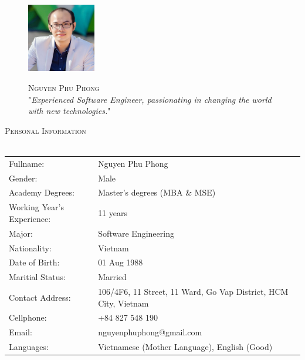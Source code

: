 \documentclass[a4paper]{article}
\newcommand{\lineunder} {
    \vspace*{-8pt} \\
    \hspace*{-18pt} \hrulefill \\
}
\newcommand{\header} [1] {
    {\hspace*{-18pt}\vspace*{6pt} \textsc{#1}}
    \vspace*{-6pt} \lineunder
}
\begin{document}
\vspace*{-40pt}

    

\vspace*{-10pt}
\begin{figure}[htp]
	\begin{minipage}{.3\textwidth}
		\includegraphics[width=3cm, frame=.2em]{Avatar.JPG}
	\end{minipage}
	\begin{minipage}{.7\textwidth}
		\begin{center}
			{\Huge \scshape {Nguyen Phu Phong}}\\
			"\textit{Experienced Software Engineer, passionating in changing the world with new technologies.}" \\
		\end{center}
	\end{minipage}
\end{figure}

\header{Personal Information}
\begin{tabular}{ l l }
	Fullname:                    & Nguyen Phu Phong \\
	Gender:                     & Male \\
	Academy Degrees: 			& Master's degrees (MBA \& MSE) \\
	Working Year's Experience: & 11 years \\
	Major: & Software Engineering \\
	Nationality:               & Vietnam \\
	Date of Birth:                       & 01 Aug 1988 \\
	Maritial Status:                     & Married                                              \\
	Contact Address:                    & 106/4F6, 11 Street, 11 Ward, Go Vap District, HCM City, Vietnam \\
	Cellphone:                         & +84 827 548 190 \\
	Email:			& nguyenphuphong@gmail.com \\
	Languages: & Vietnamese (Mother Language), English (Good)
\end{tabular}
\vspace{2mm}
\end{document}
